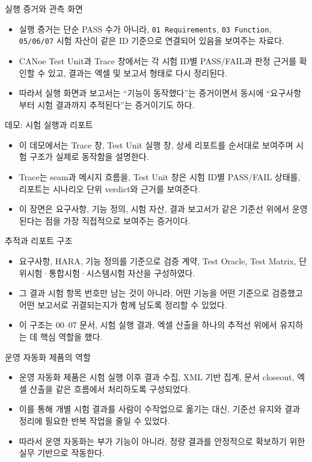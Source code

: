 \documentclass[aspectratio=169,10pt]{beamer}
\begin{document}
\begin{frame}{실행 증거와 관측 화면}
\begin{itemize}
  \item 실행 증거는 단순 PASS 수가 아니라, \texttt{01 Requirements}, \texttt{03 Function}, \texttt{05/06/07} 시험 자산이 같은 ID 기준으로 연결되어 있음을 보여주는 자료다.
  \item CANoe Test Unit과 Trace 창에서는 각 시험 ID별 PASS/FAIL과 판정 근거를 확인할 수 있고, 결과는 엑셀 및 보고서 형태로 다시 정리된다.
  \item 따라서 실행 화면과 보고서는 ``기능이 동작했다''는 증거이면서 동시에 ``요구사항부터 시험 결과까지 추적된다''는 증거이기도 하다.
\end{itemize}
\end{frame}

\begin{frame}{데모: 시험 실행과 리포트}
\begin{itemize}
  \item 이 데모에서는 Trace 창, Test Unit 실행 창, 상세 리포트를 순서대로 보여주며 시험 구조가 실제로 동작함을 설명한다.
  \item Trace는 seam과 메시지 흐름을, Test Unit 창은 시험 ID별 PASS/FAIL 상태를, 리포트는 시나리오 단위 verdict와 근거를 보여준다.
  \item 이 장면은 요구사항, 기능 정의, 시험 자산, 결과 보고서가 같은 기준선 위에서 운영된다는 점을 가장 직접적으로 보여주는 증거이다.
\end{itemize}
\end{frame}

\begin{frame}{추적과 리포트 구조}
\begin{itemize}
  \item 요구사항, HARA, 기능 정의를 기준으로 검증 계약, Test Oracle, Test Matrix, 단위시험·통합시험·시스템시험 자산을 구성하였다.
  \item 그 결과 시험 항목 번호만 남는 것이 아니라, 어떤 기능을 어떤 기준으로 검증했고 어떤 보고서로 귀결되는지가 함께 남도록 정리할 수 있었다.
  \item 이 구조는 00--07 문서, 시험 실행 결과, 엑셀 산출을 하나의 추적선 위에서 유지하는 데 핵심 역할을 했다.
\end{itemize}
\end{frame}

\begin{frame}{운영 자동화 제품의 역할}
\begin{itemize}
  \item 운영 자동화 제품은 시험 실행 이후 결과 수집, XML 기반 집계, 문서 closeout, 엑셀 산출을 같은 흐름에서 처리하도록 구성되었다.
  \item 이를 통해 개별 시험 결과를 사람이 수작업으로 옮기는 대신, 기준선 유지와 결과 정리에 필요한 반복 작업을 줄일 수 있었다.
  \item 따라서 운영 자동화는 부가 기능이 아니라, 정량 결과를 안정적으로 확보하기 위한 실무 기반으로 작동한다.
\end{itemize}
\end{frame}
\end{document}
